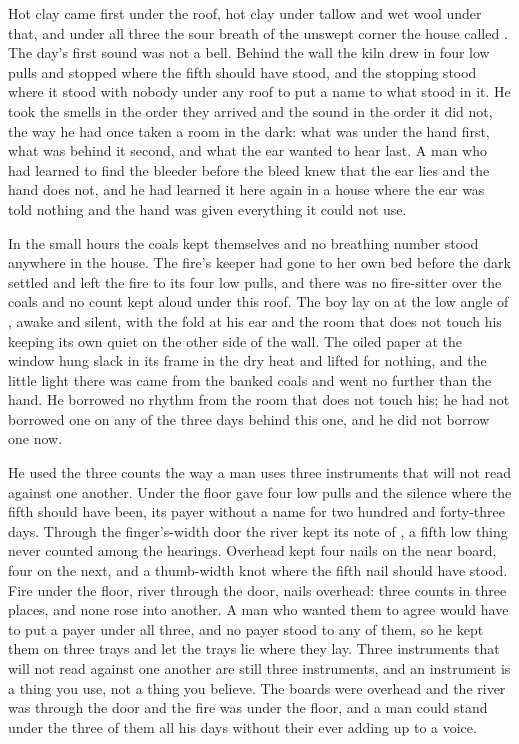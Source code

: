 Hot clay came first under the roof, hot clay under tallow and wet wool under that, and under all three the sour  breath of the unswept corner the house called . The day's first sound was not a bell. Behind the wall the kiln drew in four low pulls and stopped where the fifth should have stood, and the stopping stood where it stood with nobody under any roof to put a name to what stood in it. He took the smells in the order they arrived and the sound in the order it did not, the way he had once taken a room in the dark: what was under the hand first, what was behind it second, and what the ear wanted to hear last. A man who had learned to find the bleeder before the bleed knew that the ear lies and the hand does not, and he had learned it here again in a house where the ear was told nothing and the hand was given everything it could not use.

In the small hours the coals kept themselves and no breathing number stood anywhere in the house. The fire's keeper had gone to her own bed before the dark settled and left the fire to its four low pulls, and there was no fire-sitter over the coals and no count kept aloud under this roof. The boy lay on  at the low angle of , awake and silent, with the fold at his ear and the room that does not touch his keeping its own quiet on the other side of the wall. The oiled paper at the window hung slack in its frame in the dry heat and lifted for nothing, and the little light there was came from the banked coals and went no further than the hand. He borrowed no rhythm from the room that does not touch his; he had not borrowed one on any of the three days behind this one, and he did not borrow one now.

He used the three counts the way a man uses three instruments that will not read against one another. Under the floor  gave four low pulls and the silence where the fifth should have been, its payer without a name for two hundred and forty-three days. Through the finger's-width door the river kept its note of , a fifth low thing never counted among the hearings. Overhead  kept four nails on the near board, four on the next, and a thumb-width knot where the fifth nail should have stood. Fire under the floor, river through the door, nails overhead: three counts in three places, and none rose into another. A man who wanted them to agree would have to put a payer under all three, and no payer stood to any of them, so he kept them on three trays and let the trays lie where they lay. Three instruments that will not read against one another are still three instruments, and an instrument is a thing you use, not a thing you believe. The boards were overhead and the river was through the door and the fire was under the floor, and a man could stand under the three of them all his days without their ever adding up to a voice.

